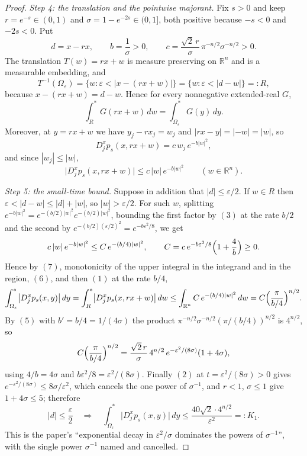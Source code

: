 \begin{proof}
\emph{Step 4: the translation and the pointwise majorant.}
Fix $s > 0$ and keep $r = e^{-s} \in (0,1)$ and $\sigma = 1-e^{-2s} \in (0,1]$,
both positive because $-s < 0$ and $-2s < 0$.  Put
\[
  d = x - rx , \qquad b = \frac1\sigma > 0 ,
  \qquad
  c = \frac{\sqrt2\,r}{\sigma}\,\pi^{-n/2}\sigma^{-n/2} > 0 .
\]
The translation $T(w) = rx+w$ is measure preserving on $\mathbb{R}^n$ and is a
measurable embedding, and
\[
  T^{-1}(\Omega_\varepsilon)
    = \{w : \varepsilon < |x-(rx+w)|\} = \{w : \varepsilon < |d-w|\}
    =: R ,
\]
because $x - (rx+w) = d-w$.  Hence for every nonnegative extended-real $G$,
\begin{equation*}
  \int^*_{R} G(rx+w)\,dw = \int^*_{\Omega_\varepsilon} G(y)\,dy .
  \tag{6}
\end{equation*}
Moreover, at $y = rx+w$ we have $y_j - rx_j = w_j$ and $|rx-y| = |{-w}| = |w|$,
so
\[
  D_j^xp_s(x,rx+w) = c\,w_j\,e^{-b|w|^2} ,
\]
and since $|w_j| \leq |w|$,
\begin{equation*}
  \bigl|D_j^xp_s(x,rx+w)\bigr| \leq c\,|w|\,e^{-b|w|^2}
  \qquad (w \in \mathbb{R}^n) .
  \tag{7}
\end{equation*}

\emph{Step 5: the small-time bound.}
Suppose in addition that $|d| \leq \varepsilon/2$.  If $w \in R$ then
$\varepsilon < |d-w| \leq |d| + |w|$, so $|w| > \varepsilon/2$.  For such $w$,
splitting $e^{-b|w|^2} = e^{-(b/2)|w|^2}e^{-(b/2)|w|^2}$, bounding the first
factor by $(3)$ at the rate $b/2$ and the second by
$e^{-(b/2)(\varepsilon/2)^2} = e^{-b\varepsilon^2/8}$, we get
\[
  c\,|w|\,e^{-b|w|^2}
    \leq C\,e^{-(b/4)|w|^2} ,
  \qquad
  C = c\,e^{-b\varepsilon^2/8}\Bigl(1+\frac4b\Bigr) \geq 0 .
\]
Hence by $(7)$, monotonicity of the upper integral in the integrand and in the
region, $(6)$, and then $(1)$ at the rate $b/4$,
\[
  \int^*_{\Omega_\varepsilon}\bigl|D_j^xp_s(x,y)\bigr|\,dy
    = \int^*_{R}\bigl|D_j^xp_s(x,rx+w)\bigr|\,dw
    \leq \int_{\mathbb{R}^n} C\,e^{-(b/4)|w|^2}\,dw
    = C\Bigl(\frac{\pi}{b/4}\Bigr)^{n/2} .
\]
By $(5)$ with $b' = b/4 = 1/(4\sigma)$ the product
$\pi^{-n/2}\sigma^{-n/2}(\pi/(b/4))^{n/2}$ is $4^{n/2}$, so
\[
  C\Bigl(\frac{\pi}{b/4}\Bigr)^{n/2}
    = \frac{\sqrt2\,r}{\sigma}\,4^{n/2}\,
        e^{-\varepsilon^2/(8\sigma)}(1+4\sigma) ,
\]
using $4/b = 4\sigma$ and $b\varepsilon^2/8 = \varepsilon^2/(8\sigma)$.  Finally
$(2)$ at $t = \varepsilon^2/(8\sigma) > 0$ gives
$e^{-\varepsilon^2/(8\sigma)} \leq 8\sigma/\varepsilon^2$, which cancels the one
power of $\sigma^{-1}$, and $r < 1$, $\sigma \leq 1$ give $1+4\sigma \leq 5$;
therefore
\begin{equation*}
  |d| \leq \frac\varepsilon2
  \quad\Longrightarrow\quad
  \int^*_{\Omega_\varepsilon}\bigl|D_j^xp_s(x,y)\bigr|\,dy
    \leq \frac{40\sqrt2\cdot4^{n/2}}{\varepsilon^2} =: K_1 .
  \tag{8}
\end{equation*}
This is the paper's ``exponential decay in $\varepsilon^2/\sigma$ dominates the
powers of $\sigma^{-1}$'', with the single power $\sigma^{-1}$ named and
cancelled.


\end{proof}
